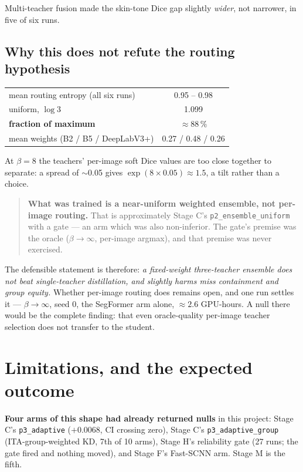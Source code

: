 \documentclass[11pt,a4paper]{article}
\newcommand{\bad}[1]{\textcolor{warn}{\textbf{#1}}}
\begin{document}
Multi-teacher fusion made the skin-tone Dice gap slightly \emph{wider}, not
narrower, in five of six runs.

\subsection{Why this does not refute the routing hypothesis}
\label{sec:notrouting}

\begin{center}\small
\begin{tabular}{lc}
\toprule
mean routing entropy (all six runs) & 0.95 -- 0.98 \\
uniform, $\log 3$ & 1.099 \\
\textbf{fraction of maximum} & \bad{$\approx 88\,\%$} \\
mean weights (B2 / B5 / DeepLabV3+) & 0.27 / 0.48 / 0.26 \\
\bottomrule
\end{tabular}
\end{center}

At $\beta = 8$ the teachers' per-image soft Dice values are too close together to
separate: a spread of $\sim$0.05 gives $\exp(8 \times 0.05) \approx 1.5$, a tilt
rather than a choice.

\begin{quote}
\textbf{What was trained is a near-uniform weighted ensemble, not per-image
routing.} That is approximately Stage C's \texttt{p2\_ensemble\_uniform} with a
gate --- an arm which was also non-inferior. The gate's premise was the oracle
($\beta \to \infty$, per-image argmax), and that premise was never exercised.
\end{quote}

The defensible statement is therefore: \emph{a fixed-weight three-teacher
ensemble does not beat single-teacher distillation, and slightly harms miss
containment and group equity.} Whether per-image routing does remains open, and
one run settles it --- $\beta \to \infty$, seed 0, the SegFormer arm alone,
$\approx 2.6$ GPU-hours. A null there would be the complete finding: that even
oracle-quality per-image teacher selection does not transfer to the student.

\section{Limitations, and the expected outcome}

\textbf{Four arms of this shape had already returned nulls} in this project:
Stage C's \texttt{p3\_adaptive} ($+0.0068$, CI crossing zero), Stage C's
\texttt{p3\_adaptive\_group} (ITA-group-weighted KD, 7th of 10 arms), Stage H's
reliability gate (27 runs; the gate fired and nothing moved), and Stage F's
Fast-SCNN arm. Stage M is the fifth.
\end{document}
